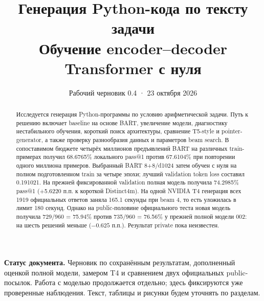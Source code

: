 \documentclass[11pt,a4paper]{article}
\title{\textbf{Генерация Python-кода по тексту задачи}\\
\large Обучение encoder--decoder Transformer с нуля}
\author{}
\date{Рабочий черновик 0.4 · 23 октября 2026}
\makeatletter
\newcommand{\pass}{\textnormal{pass@1}}
\newcommand{\loss}{\textnormal{token loss}}
\makeatother
\begin{document}
\maketitle
\begin{abstract}
Исследуется генерация Python-программы по условию арифметической задачи.
Путь к решению включает baseline на основе BART, увеличение модели,
диагностику нестабильного обучения, короткий поиск архитектуры,
сравнение T5-style и pointer-generator, а также проверку разнообразия
данных и параметров beam search. В сопоставимом бюджете четырёх миллионов
предъявлений BART на различных train-примерах получил 68.6765\% локального
\pass{} против 67.6104\% при повторении одного миллиона примеров.
Выбранный BART 8+8/d1024 затем обучен с нуля на полном подготовленном train
за четыре эпохи; лучший validation \loss{} составил 0.191021.
На прежней фиксированной validation полная модель получила 74.2985\%
\pass{} (+5.6220 п.п. к короткой Distinct4m). На одной NVIDIA T4
генерация всех 1919 официальных ответов заняла 165.1 секунды при beam 4,
то есть уложилась в лимит 180 секунд. Однако на public-половине
официального теста новая модель получила 729/960 = 75.94\%
против 735/960 = 76.56\% у прежней полной модели 002:
на шесть решений меньше ($-0.625$ п.п.). Результат private пока неизвестен.
\end{abstract}
{\small\textbf{Статус документа.} Черновик по сохранённым
результатам, дополненный оценкой полной модели, замером T4
и сравнением двух официальных public-посылок.
Работа с моделью продолжается отдельно; здесь фиксируются уже
проверенные наблюдения. Текст, таблицы и рисунки будем уточнять по разделам.}
{\small\tableofcontents}
\newpage






\end{document}
